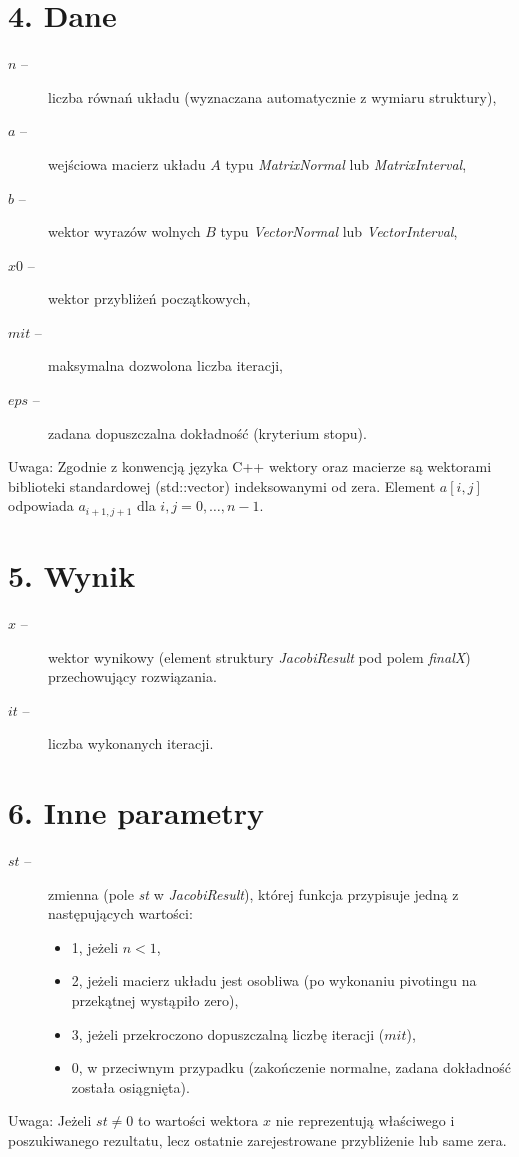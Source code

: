 \documentclass[11pt,a4paper]{article}
\begin{document}
\section*{4. Dane}
\begin{description}
    \item[$n$ --] liczba równań układu (wyznaczana automatycznie z wymiaru struktury),
    \item[$a$ --] wejściowa macierz układu $A$ typu \textit{MatrixNormal} lub \textit{MatrixInterval},
    \item[$b$ --] wektor wyrazów wolnych $B$ typu \textit{VectorNormal} lub \textit{VectorInterval},
    \item[$x0$ --] wektor przybliżeń początkowych,
    \item[$mit$ --] maksymalna dozwolona liczba iteracji,
    \item[$eps$ --] zadana dopuszczalna dokładność (kryterium stopu).
\end{description}
Uwaga: Zgodnie z konwencją języka C++ wektory oraz macierze są wektorami biblioteki standardowej (std::vector) indeksowanymi od zera. Element $a[i, j]$ odpowiada $a_{i+1, j+1}$ dla $i,j = 0, \dots, n-1$.

\section*{5. Wynik}
\begin{description}
    \item[$x$ --] wektor wynikowy (element struktury \textit{JacobiResult} pod polem \textit{finalX}) przechowujący rozwiązania.
    \item[$it$ --] liczba wykonanych iteracji.
\end{description}

\section*{6. Inne parametry}
\begin{description}
    \item[$st$ --] zmienna (pole \textit{st} w \textit{JacobiResult}), której funkcja przypisuje jedną z następujących wartości:
    \begin{itemize}
        \item 1, jeżeli $n<1$,
        \item 2, jeżeli macierz układu jest osobliwa (po wykonaniu pivotingu na przekątnej wystąpiło zero),
        \item 3, jeżeli przekroczono dopuszczalną liczbę iteracji ($mit$),
        \item 0, w przeciwnym przypadku (zakończenie normalne, zadana dokładność została osiągnięta).
    \end{itemize}
\end{description}
Uwaga: Jeżeli $st \neq 0$ to wartości wektora $x$ nie reprezentują właściwego i poszukiwanego rezultatu, lecz ostatnie zarejestrowane przybliżenie lub same zera.
\end{document}
